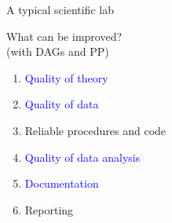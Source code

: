 %
%
\begin{lhframe}[rhgraphic={\texttt{[image: car\_salesman.jpg]}}]
	{A typical scientific lab}
	
	What can be improved? \\
	{\small (with DAGs and PP)}
	\begin{enumerate}
		\item \textcolor{blue}{Quality of theory}
		\item \textcolor{blue}{Quality of data}
		\item \alert{Reliable procedures and code}
		\item \textcolor{blue}{Quality of data analysis}
		\item \textcolor{blue}{Documentation}
		\item Reporting
	\end{enumerate}
\end{lhframe}
%
%
